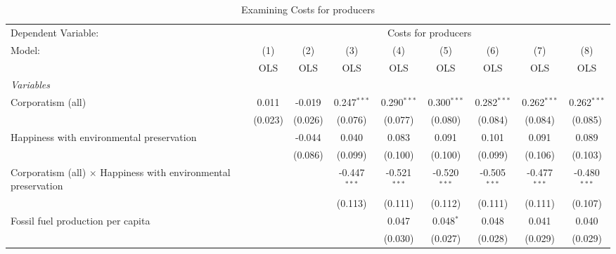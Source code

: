 
\begin{table}[htbp]
   \caption{Examining Costs for producers}
   \centering
   \begin{tabular}{lcccccccc}
      \toprule
      Dependent Variable: & \multicolumn{8}{c}{Costs for producers}\\
      Model:                                                                & (1)     & (2)     & (3)            & (4)            & (5)            & (6)            & (7)            & (8)\\  
                                                                            &  OLS    & OLS     & OLS            & OLS            & OLS            & OLS            & OLS            & OLS\\  
      \midrule
      \emph{Variables}\\
      Corporatism (all)                                                     & 0.011   & -0.019  & 0.247$^{***}$  & 0.290$^{***}$  & 0.300$^{***}$  & 0.282$^{***}$  & 0.262$^{***}$  & 0.262$^{***}$\\   
                                                                            & (0.023) & (0.026) & (0.076)        & (0.077)        & (0.080)        & (0.084)        & (0.084)        & (0.085)\\   
      Happiness with environmental preservation                             &         & -0.044  & 0.040          & 0.083          & 0.091          & 0.101          & 0.091          & 0.089\\   
                                                                            &         & (0.086) & (0.099)        & (0.100)        & (0.100)        & (0.099)        & (0.106)        & (0.103)\\   
      Corporatism (all) $\times$ Happiness with environmental preservation  &         &         & -0.447$^{***}$ & -0.521$^{***}$ & -0.520$^{***}$ & -0.505$^{***}$ & -0.477$^{***}$ & -0.480$^{***}$\\   
                                                                            &         &         & (0.113)        & (0.111)        & (0.112)        & (0.111)        & (0.111)        & (0.107)\\   
      Fossil fuel production per capita                                     &         &         &                & 0.047          & 0.048$^{*}$    & 0.048          & 0.041          & 0.040\\   
                                                                            &         &         &                & (0.030)        & (0.027)        & (0.028)        & (0.029)        & (0.029)\\   

\end{tabular}
\end{table}
